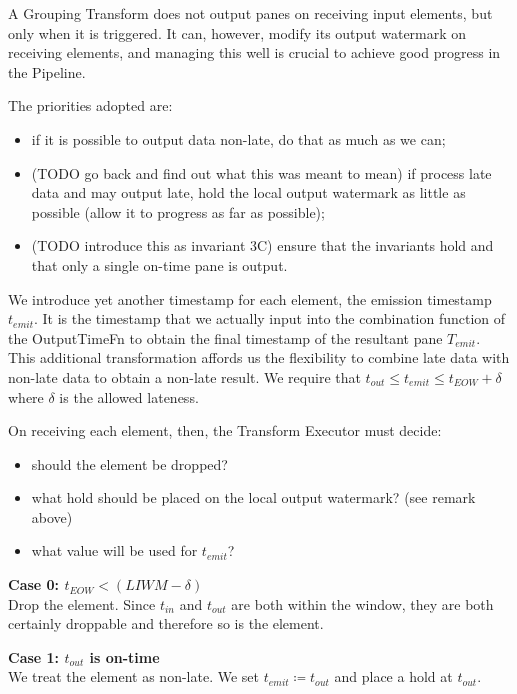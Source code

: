 A Grouping Transform does not output panes on receiving input elements, but only when it is triggered.
It can, however, modify its output watermark on receiving elements, and managing this well is crucial to achieve good progress in the Pipeline.

The priorities adopted are:
\begin{itemize}
	\item if it is possible to output data non-late, do that as much as we can;
	\item (TODO go back and find out what this was meant to mean) if process late data and may output late, hold the local output watermark as little as possible (allow it to progress as far as possible);
	\item (TODO introduce this as invariant 3C) ensure that the invariants hold and that only a single on-time pane is output.
\end{itemize}

We introduce yet another timestamp for each element, the emission timestamp $t_{\mathit{emit}}$.
It is the timestamp that we actually input into the combination function of the OutputTimeFn to obtain the final timestamp of the resultant pane $T_{\mathit{emit}}$.
This additional transformation affords us the flexibility to combine late data with non-late data to obtain a non-late result.
We require that $t_{\mathit{out}} \leq t_{\mathit{emit}} \leq t_{\mathit{EOW}} + \delta$ where $\delta$ is the allowed lateness.

On receiving each element, then, the Transform Executor must decide:
\begin{itemize}
	\item should the element be dropped?
	\item what hold should be placed on the local output watermark? (see remark above)
	\item what value will be used for $t_{\mathit{emit}}$?
\end{itemize}


\textbf{Case 0: $t_{\mathit{EOW}} < (\mathit{LIWM} - \delta)$}\\
Drop the element.
Since $t_{\mathit{in}}$ and $t_{\mathit{out}}$ are both within the window, they are both certainly droppable and therefore so is the element.

\textbf{Case 1: $t_{\mathit{out}}$ is on-time}\\
We treat the element as non-late.
We set $t_{\mathit{emit}} \coloneq t_{\mathit{out}}$ and place a hold at $t_{\mathit{out}}$.

